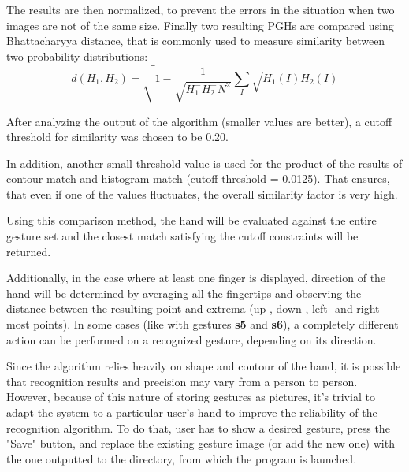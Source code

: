\documentclass[a4paper,11pt,oneside]{article}
\begin{document}
\begin{itemize}
The results are then normalized, to prevent the errors in the situation when two images are not of the same size. Finally two resulting PGHs are compared using Bhattacharyya distance, that is commonly used to measure similarity between two probability distributions:
\[ d(H_1, H_2) = \sqrt{1- \frac{1}{ \sqrt{H_1^{-} H_2^{-} N^2}}  \sum\limits_{I} \sqrt{H_1(I) H_2(I)}} \] 

After analyzing the output of the algorithm (smaller values are better), a cutoff threshold for similarity was chosen to be 0.20.\\

\end{itemize}

In addition, another small threshold value is used for the product of the results of contour match and histogram match (cutoff threshold = 0.0125). That ensures, that even if one of the values fluctuates, the overall similarity factor is very high.

Using this comparison method, the hand will be evaluated against the entire gesture set and the closest match satisfying the cutoff constraints will be returned.

Additionally, in the case where at least one finger is displayed, direction of the hand will be determined by averaging all the fingertips and observing the distance between the resulting point and extrema (up-, down-, left- and right-most points). In some cases (like with gestures \textbf{s5} and \textbf{s6}), a completely different action can be performed on a recognized gesture, depending on its direction.

Since the algorithm relies heavily on shape and contour of the hand, it is possible that recognition results and precision may vary from a person to person. However, because of this nature of storing gestures as pictures, it's trivial to adapt the system to a particular user's hand to improve the reliability of the recognition algorithm. To do that, user has to show a desired gesture, press the "Save" button, and replace the existing gesture image (or add the new one) with the one outputted to the directory, from which the program is launched. 
\end{document}
